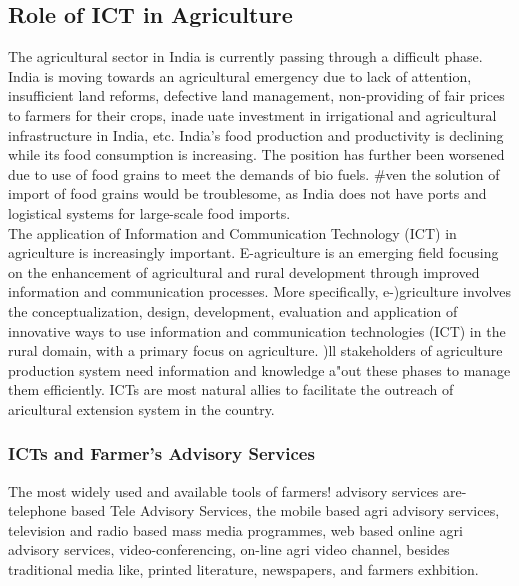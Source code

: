 \documentclass[11pt,largemargins]{homework}
\begin{document}
\subsection{Role of ICT in Agriculture}


The agricultural sector in India is currently passing through a difficult phase. India is moving towards an agricultural emergency due to lack of attention, insufficient land reforms, defective land management, non-providing of fair prices to farmers for their crops, inadeuate investment in irrigational and agricultural infrastructure in India, etc. India's food production and productivity is declining while its food consumption is increasing. The position has further been worsened due to use of food grains to meet the demands of bio fuels. #ven the solution of import of food grains would be troublesome, as India does not have ports and logistical systems for large-scale food imports.\\

The application of Information and Communication Technology (ICT) in agriculture is increasingly important. E-agriculture is an emerging field focusing on the enhancement of agricultural and rural development through improved information and communication processes. More specifically, e-)griculture involves the conceptualization, design, development, evaluation and application of innovative ways to use information and communication technologies (ICT) in the rural domain, with a  primary focus on agriculture. )ll stakeholders of agriculture production system need information and knowledge a"out these phases to manage them efficiently. ICTs are most natural allies to facilitate the outreach of aricultural extension system in the country.\\

\subsubsection{ICTs and Farmer's Advisory Services}
The most widely used and available tools of farmers! advisory services are- telephone based Tele Advisory Services, the mobile based agri advisory services, television and radio based mass media  programmes, web based online agri advisory services, video-conferencing, on-line agri video channel, besides traditional media like, printed literature, newspapers, and farmers exhbition.\\
\end{document}
